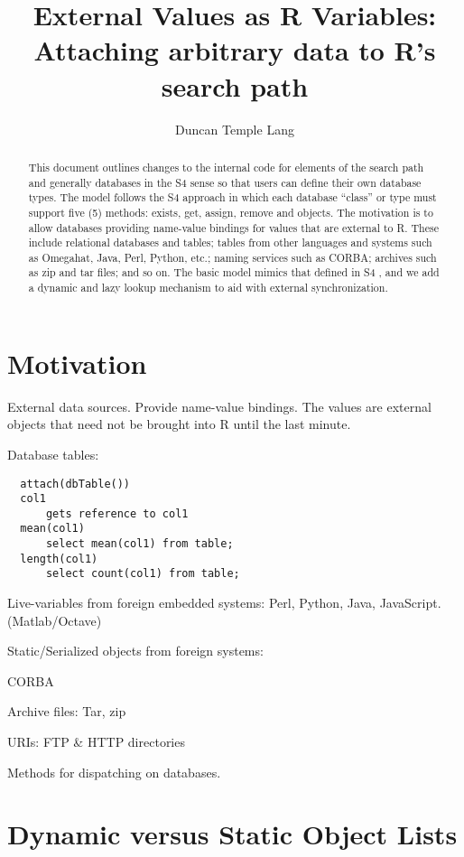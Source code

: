 \documentclass{article}
\title{External Values as R Variables: Attaching arbitrary data to R's
  search path}
\author{Duncan Temple Lang}
\date{}
\begin{document}
\maketitle
\begin{abstract}
  
This document outlines changes to the internal code for elements of
the search path and generally databases in the S4 sense so that users
can define their own database types.  The model follows the S4
approach in which each database ``class'' or type must support five
(5) methods: exists, get, assign, remove and objects.  The motivation
is to allow databases providing name-value bindings for values that
are external to R.  These include relational databases and tables;
tables from other languages and systems such as Omegahat, Java, Perl,
Python, etc.; naming services such as CORBA; archives such as zip and
tar files; and so on.
The basic model mimics that defined in S4 \cite{S4:databases},
and we add a dynamic and lazy  lookup mechanism to aid
with external synchronization.

\end{abstract}

\section{Motivation}

External data sources.
Provide name-value bindings.
The values are external objects that need not be brought
into R until the last minute.

Database tables:
\begin{verbatim}
  attach(dbTable())
  col1
      gets reference to col1
  mean(col1) 
      select mean(col1) from table;
  length(col1)
      select count(col1) from table;
\end{verbatim}


Live-variables from foreign embedded systems: Perl, Python, Java, JavaScript.
   (Matlab/Octave)

Static/Serialized objects from foreign systems:

CORBA

Archive files: Tar, zip

URIs: FTP \& HTTP directories

Methods for dispatching on databases.

\section{Dynamic versus Static Object Lists}
\end{document}
